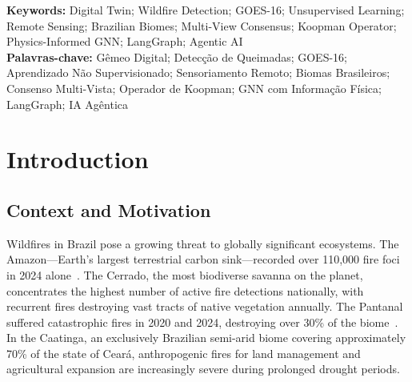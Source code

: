 \documentclass[11pt,twocolumn,a4paper]{article}
\begin{document}
\begin{otherlanguage}{portuguese}
\begin{abstract}
digital bidirecional de incêndios brasileiro integrando INPE, NASA FIRMS, MapBiomas, redes de sensores IoT e suporte autônomo à decisão baseado em agentes.
Código disponível em \url{https://github.com/naubergois/ceara-queimadas}.\end{abstract}
\end{otherlanguage}

\noindent\textbf{Keywords:} Digital Twin; Wildfire Detection; GOES-16; Unsupervised Learning; Remote Sensing; Brazilian Biomes; Multi-View Consensus; Koopman Operator; Physics-Informed GNN; LangGraph; Agentic AI \\
\textbf{Palavras-chave:} Gêmeo Digital; Detecção de Queimadas; GOES-16; Aprendizado Não Supervisionado; Sensoriamento Remoto; Biomas Brasileiros; Consenso Multi-Vista; Operador de Koopman; GNN com Informação Física; LangGraph; IA Agêntica

\section{Introduction}
\label{sec:intro}

\subsection{Context and Motivation}

Wildfires in Brazil pose a growing threat to globally significant ecosystems. The Amazon---Earth's largest terrestrial carbon sink---recorded over 110,000 fire foci in 2024 alone~\cite{inpe2025}. The Cerrado, the most biodiverse savanna on the planet, concentrates the highest number of active fire detections nationally, with recurrent fires destroying vast tracts of native vegetation annually. The Pantanal suffered catastrophic fires in 2020 and 2024, destroying over 30\% of the biome~\cite{mapbiomas2025}. In the Caatinga, an exclusively Brazilian semi-arid biome covering approximately 70\% of the state of Cear\'{a}, anthropogenic fires for land management and agricultural expansion are increasingly severe during prolonged drought periods.
\end{document}
